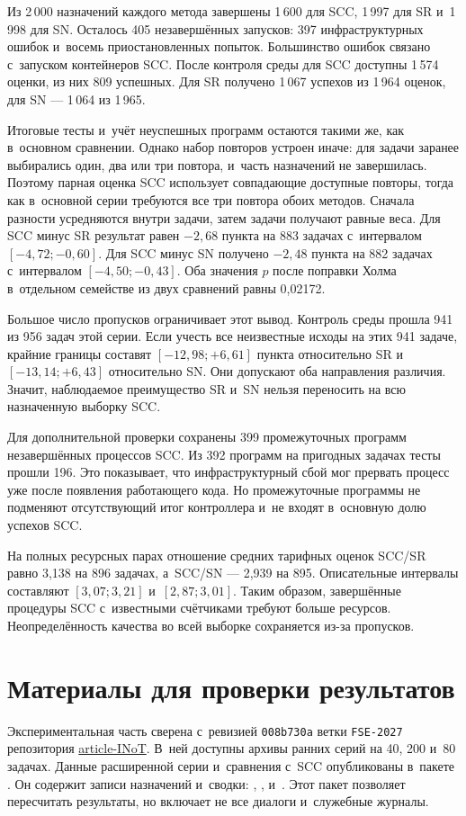 Из 2\,000 назначений каждого метода завершены 1\,600 для SCC, 1\,997 для SR и~1\,998 для SN. Осталось 405 незавершённых запусков: 397 инфраструктурных ошибок и~восемь приостановленных попыток. Большинство ошибок связано с~запуском контейнеров SCC. После контроля среды для SCC доступны 1\,574 оценки, из них 809 успешных. Для SR получено 1\,067 успехов из 1\,964 оценок, для SN --- 1\,064 из 1\,965.

Итоговые тесты и~учёт неуспешных программ остаются такими же, как в~основном сравнении. Однако набор повторов устроен иначе: для задачи заранее выбирались один, два или три повтора, и~часть назначений не завершилась. Поэтому парная оценка SCC использует совпадающие доступные повторы, тогда как в~основной серии требуются все три повтора обоих методов. Сначала разности усредняются внутри задачи, затем задачи получают равные веса. Для SCC минус SR результат равен $-2{,}68$ пункта на 883 задачах с~интервалом $[-4{,}72;-0{,}60]$. Для SCC минус SN получено $-2{,}48$ пункта на 882 задачах с~интервалом $[-4{,}50;-0{,}43]$. Оба значения $p$ после поправки Холма в~отдельном семействе из двух сравнений равны 0,02172.

Большое число пропусков ограничивает этот вывод. Контроль среды прошла 941 из 956 задач этой серии. Если учесть все неизвестные исходы на этих 941 задаче, крайние границы составят $[-12{,}98;+6{,}61]$ пункта относительно SR и~$[-13{,}14;+6{,}43]$ относительно SN. Они допускают оба направления различия. Значит, наблюдаемое преимущество SR и~SN нельзя переносить на всю назначенную выборку SCC.

Для дополнительной проверки сохранены 399 промежуточных программ незавершённых процессов SCC. Из 392 программ на пригодных задачах тесты прошли 196. Это показывает, что инфраструктурный сбой мог прервать процесс уже после появления работающего кода. Но промежуточные программы не подменяют отсутствующий итог контроллера и~не входят в~основную долю успехов SCC.

На полных ресурсных парах отношение средних тарифных оценок SCC/SR равно 3,138 на 896 задачах, а~SCC/SN --- 2,939 на 895. Описательные интервалы составляют $[3{,}07;3{,}21]$ и~$[2{,}87;3{,}01]$. Таким образом, завершённые процедуры SCC с~известными счётчиками требуют больше ресурсов. Неопределённость качества во всей выборке сохраняется из-за пропусков.


\section{Материалы для проверки результатов}\label{app:materials}
Экспериментальная часть сверена с~ревизией \texttt{008b730a} ветки \texttt{FSE-2027} репозитория \href{https://github.com/daniil-novel/article-INoT/tree/008b730a905277079710092ecf3881770eb100fc}{article-INoT}. В~ней доступны архивы ранних серий на 40, 200 и~80 задачах. Данные расширенной серии и~сравнения с~SCC опубликованы в~пакете . Он содержит записи назначений и~сводки: , ,  и~. Этот пакет позволяет пересчитать результаты, но включает не все диалоги и~служебные журналы.

